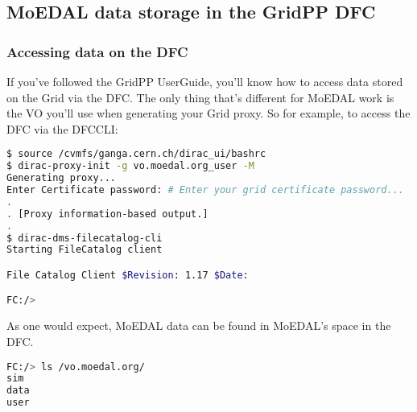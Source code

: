 \subsection{MoEDAL data storage in the GridPP DFC}
\label{sec:data}

\subsubsection{Accessing data on the DFC}
\label{sec:dataaccess}
If you've followed the GridPP UserGuide, you'll know how to access data
stored on the Grid via the \acf{DFC}.
The only thing that's different for MoEDAL work is the \ac{VO} you'll use
when generating your Grid proxy. So for example, to access the
\ac{DFC} via the \acf{DFCCLI}:

\begin{lstlisting}[gobble=0,numbers=none,language=bash]
$ source /cvmfs/ganga.cern.ch/dirac_ui/bashrc
$ dirac-proxy-init -g vo.moedal.org_user -M
Generating proxy... 
Enter Certificate password: # Enter your grid certificate password...
.
. [Proxy information-based output.]
.
$ dirac-dms-filecatalog-cli 
Starting FileCatalog client

File Catalog Client $Revision: 1.17 $Date: 

FC:/>
\end{lstlisting} 


As one would expect,
MoEDAL data can be found in MoEDAL's space in the \ac{DFC}.
\begin{lstlisting}[gobble=0,numbers=none,language=bash]
FC:/> ls /vo.moedal.org/
sim
data
user
\end{lstlisting}

